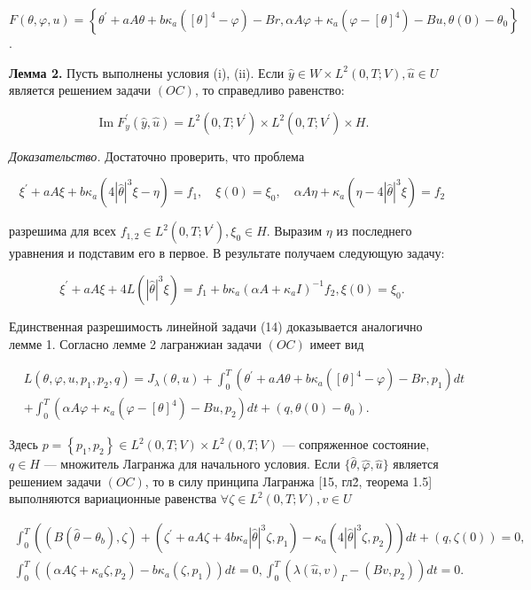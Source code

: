 $F(\theta, \varphi, u)=\left\{\theta^{\prime}+
a A \theta+b \kappa_{a}\left([\theta]^{4}-\varphi\right)-B r,
\alpha A \varphi+\kappa_{a}\left(\varphi-[\theta]^{4}\right)-B u, \theta(0)-\theta_{0}\right\}$.

\textbf{Лемма 2.}
Пусть выполнены условия (i), (ii).
Если $\widehat{y} \in W \times L^{2}(0, T ; V), \widehat{u} \in U$
является решением задачи $(OC)$, то справедливо равенство:

\[
\operatorname{Im} F_{y}^{\prime}
(\widehat{y}, \widehat{u})=L^{2}\left(0, T; V^{\prime}\right)
\times L^{2}\left(0, T; V^{\prime}\right) \times H.
\]

\textit{Доказательство.}
Достаточно проверить, что проблема

\[
\xi^{\prime}+a A \xi+b \kappa_{a}\left(4|\widehat{\theta}|^{3}
\xi-\eta\right)=f_{1}, \quad \xi(0)=\xi_{0},
\quad \alpha A \eta+\kappa_{a}\left(\eta-4|\widehat{\theta}|^{3} \xi\right)=f_{2}
\]

разрешима для всех $f_{1,2} \in L^{2}\left(0, T; V^{\prime}\right), \xi_{0} \in H$.
Выразим $\eta$ из последнего уравнения и подставим его в первое.
В результате получаем следующую задачу:


\[
\xi^{\prime}+a A \xi+4 L\left(|\widehat{\theta}|^{3}
\xi\right)=f_{1}+b \kappa_{a}\left(\alpha A+\kappa_{a}
I\right)^{-1} f_{2}, \xi(0)=\xi_{0}.
\]

Единственная разрешимость линейной задачи (14) доказывается аналогично лемме 1.
Согласно лемме 2 лагранжиан задачи $(OC)$ имеет вид

\[
\begin{aligned}
& L\left(\theta, \varphi, u, p_{1}, p_{2}, q\right)=J_{\lambda}(\theta, u)
+\int_{0}^{T}\left(\theta^{\prime} +a A \theta+b \kappa_{a}\left([\theta]^{4}-\varphi\right)
-B r, p_{1}\right) d t \\
&+\int_{0}^{T}\left(\alpha A \varphi+\kappa_{a}\left(\varphi-[\theta]^{4}\right)-B u,
p_{2}\right) d t+\left(q, \theta(0)-\theta_{0}\right).
\end{aligned}
\]

Здесь $p=\left\{p_{1}, p_{2}\right\} \in L^{2}(0, T; V) \times L^{2}(0, T; V) $ — сопряженное состояние,
$q \in H$ — множитель Лагранжа для начального условия.
Если $\{\widehat{\theta}, \widehat{\varphi}, \widehat{u}\}$ является решением задачи $(OC)$,
то в силу принципа Лагранжа [15, гл\. 2, теорема 1.5]
выполняются вариационные равенства $\forall \zeta \in L^{2}(0, T ; V), v \in U$

\[
\begin{gathered}
\int_{0}^{T}\left(\left(B\left(\widehat{\theta}-\theta_{b}\right),
\zeta\right)+\left(\zeta^{\prime}
+a A \zeta+4 b \kappa_{a}|\widehat{\theta}|^{3} \zeta, p_{1}\right)
-\kappa_{a}\left(4|\widehat{\theta}|^{3} \zeta, p_{2}\right)\right) d t+(q, \zeta(0))=0, \\
\int_{0}^{T}\left(\left(\alpha A \zeta
+\kappa_{a} \zeta, p_{2}\right)-b \kappa_{a}\left(\zeta, p_{1}\right)\right) d t=0,
\int_{0}^{T}\left(\lambda(\widehat{u}, v)_{\Gamma}-\left(B v, p_{2}\right)\right) d t=0.
\end{gathered}
\]

